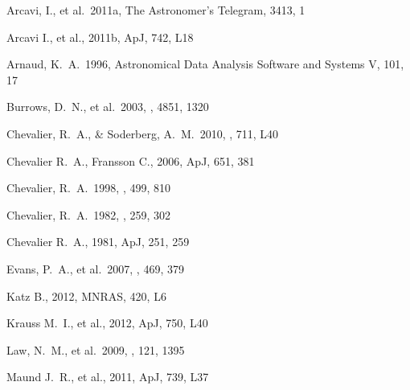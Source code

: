 \documentclass{emulateapj}
\begin{document}




\begin{thebibliography}{}

 Arcavi, I., et al.\ 
2011a, The Astronomer's Telegram, 3413, 1

Arcavi I., et al., 2011b, ApJ, 742, L18 

 Arnaud, K.~A.\ 1996, 
Astronomical Data Analysis Software and Systems V, 101, 17 

 Burrows, D.~N., et al.\ 
2003, \procspie, 4851, 1320


 Chevalier, R.~A., \&
Soderberg, A.~M.\ 2010, \apjl, 711, L40 

 Chevalier R.~A., Fransson C.,
2006, ApJ, 651, 381 

 Chevalier, R.~A.\ 1998, 
\apj, 499, 810 

 Chevalier, R.~A.\ 1982, 
\apj, 259, 302



Chevalier R.~A., 1981, ApJ, 251, 259 

 Evans, P.~A., et al.\ 2007, \aap, 469,
379

 Katz B., 
2012, MNRAS, 420, L6 

Krauss M.~I., et al., 2012, ApJ, 750, L40 

 Law, N.~M., et al.\ 2009, 
\pasp, 121, 1395 

Maund J.~R., et al., 2011, ApJ, 739, L37 


\end{thebibliography}
\end{document}
